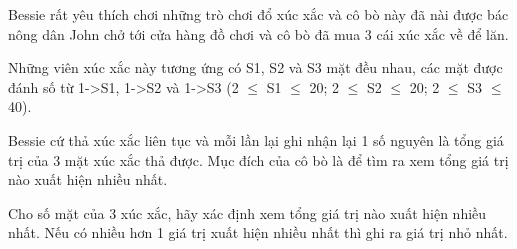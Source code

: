 Bessie rất yêu thích chơi những trò chơi đổ xúc xắc và cô bò này đã nài được bác nông dân John chở tới cửa hàng đồ chơi và cô bò đã mua 3 cái xúc xắc về để lăn.  

   Những viên xúc xắc này tương ứng có S1, S2 và S3 mặt đều nhau, các mặt được đánh  số từ 1->S1, 1->S2 và 1->S3 (2  $\le$  S1  $\le$  20; 2  $\le$  S2  $\le$  20; 2  $\le$  S3  $\le$  40).  

   Bessie cứ thả xúc xắc liên tục và mỗi lần lại ghi nhận lại 1 số nguyên là tổng giá trị  của 3 mặt xúc xắc thả được. Mục đích của cô bò là để tìm ra xem tổng giá trị nào  xuất hiện nhiều nhất.  

   Cho số mặt của 3 xúc xắc, hãy xác định xem tổng giá trị nào xuất hiện nhiều nhất. Nếu có nhiều hơn 1 giá trị xuất hiện nhiều nhất thì ghi ra giá trị nhỏ nhất.